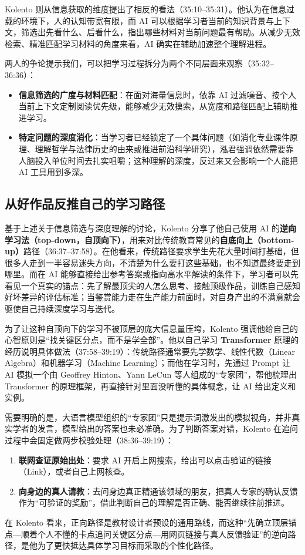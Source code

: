 \documentclass[UTF8,a4paper,11pt,fontset=fandol]{ctexart}
\begin{document}
Kolento 则从信息获取的维度提出了相反的看法（35:10–35:31）。他认为在信息过载的环境下，人的认知带宽有限，而 AI 可以根据学习者当前的知识背景与上下文，筛选出先看什么、后看什么，指出哪些材料对当前问题最有帮助。从减少无效检索、精准匹配学习材料的角度来看，AI 确实在辅助加速整个理解进程。

两人的争论提示我们，可以把学习过程拆分为两个不同层面来观察（35:32–36:36）：
\begin{itemize}
\item \textbf{信息筛选的广度与材料匹配}：在面对海量信息时，依靠 AI 过滤噪音、按个人当前上下文定制阅读优先级，能够减少无效摸索，从宽度和路径匹配上辅助推进学习。
\item \textbf{特定问题的深度消化}：当学习者已经锁定了一个具体问题（如消化专业课件原理、理解哲学与法律历史的由来或推进前沿科学研究），泓君强调依然需要靠人脑投入单位时间去扎实咀嚼；这种理解的深度，反过来又会影响一个人能把 AI 工具用到多深。
\end{itemize}

\subsection{从好作品反推自己的学习路径}
基于上述关于信息筛选与深度理解的讨论，Kolento 分享了他自己使用 AI 的\textbf{逆向学习法（top-down，自顶向下）}，用来对比传统教育常见的\textbf{自底向上（bottom-up）}路径（36:37–37:58）。在他看来，传统路径要求学生先花大量时间打基础，但很多人走到一半容易迷失方向，不清楚为什么要打这些基础，也不知道最终要走到哪里。而在 AI 能够直接给出参考答案或指向高水平解读的条件下，学习者可以先看见一个真实的锚点：先了解最顶尖的人怎么思考、接触顶级作品，训练自己感知好坏差异的评估标准；当鉴赏能力走在生产能力前面时，对自身产出的不满意就会驱使自己持续深度学习与迭代。

为了让这种自顶向下的学习不被顶层的庞大信息量压垮，Kolento 强调他给自己的心智原则是“找关键区分点，而不是学全部”。他以自己学习 \textbf{Transformer} 原理的经历说明具体做法（37:58–39:19）：传统路径通常要先学数学、线性代数（Linear Algebra）和机器学习（Machine Learning）；而他在学习时，先通过 Prompt 让 AI 模拟一个由 Geoffrey Hinton、Yann LeCun 等人组成的“专家团”，帮他梳理出 Transformer 的原理框架，再直接针对里面没听懂的具体概念，让 AI 给出定义和实例。

需要明确的是，大语言模型组织的“专家团”只是提示词激发出的模拟视角，并非真实学者的发言，模型给出的答案也未必准确。为了判断答案对错，Kolento 在追问过程中会固定做两步校验处理（38:36–39:19）：
\begin{enumerate}
\item \textbf{联网查证原始出处}：要求 AI 开启上网搜索，给出可以点击验证的链接（Link），或者自己上网核查。
\item \textbf{向身边的真人请教}：去问身边真正精通该领域的朋友，把真人专家的确认反馈作为“可验证的奖励”，借此判断自己的理解是否正确、能否继续往前推进。
\end{enumerate}
在 Kolento 看来，正向路径是教材设计者预设的通用路线，而这种“先确立顶层锚点—顺着个人不懂的卡点追问关键区分点—用网页链接与真人反馈验证”的逆向路径，是他为了更快抵达具体学习目标而采取的个性化路径。
\end{document}

